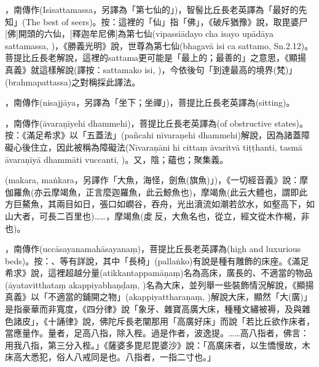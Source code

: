 \startitemgroup[noteitems]
\item{}，南傳作(Isisattamassa，另譯為「第七仙的」)，智髻比丘長老英譯為「最好的先知」(The best of seers)。按：這裡的「仙」指「佛」，《破斥猶豫》說，取毘婆尸[佛]開頭的六仙，[釋迦牟尼佛]為第七仙(vipassiādayo cha isayo upādāya sattamassa, )，《勝義光明》說，世尊為第七仙(bhagavā isi ca sattamo, Sn.2.12)。菩提比丘長老解說，這裡的sattama更可能是「最上的；最善的」之意思，《顯揚真義》就這樣解說(譯按：sattamako isi, )，今依後句「到達最高的境界(梵)」(brahmapattassa)之對稱採此譯法。
\stopitemgroup

\startitemgroup[noteitems]
\item{}，南傳作(nisajjāya，另譯為「坐下；坐禪」)，菩提比丘長老英譯為(sitting)。
\item{}，南傳作(āvaraṇīyehi dhammehi)，菩提比丘長老英譯為(of obstructive states)。按：《滿足希求》以「五蓋法」(pañcahi nīvaraṇehi dhammehi)解說，因為諸蓋障礙心後住立，因此被稱為障礙法(Nīvaraṇāni hi cittaṃ āvaritvā tiṭṭhanti, tasmā āvaraṇīyā dhammāti vuccanti, )。又，陰；蘊也；聚集義。
\stopitemgroup

\startitemgroup[noteitems]
\item{}(makara, maṅkara，另譯作「大魚，海怪，劍魚(旗魚)」)，《一切經音義》說：摩伽羅魚(亦云摩竭魚，正言麼迦羅魚，此云鯨魚也)，摩竭魚(此云大體也，謂即此方巨鰲魚，其兩目如日，張口如𡼏谷，吞舟，光出濆流如潮若欱水，如壑高下，如山大者，可長二百里也)……，摩竭魚(䖍𦾨反，大魚名也，從立，經文從木作楬，非也)。
\stopitemgroup

\startitemgroup[noteitems]
\item{}，南傳作(uccāsayanamahāsayanaṃ)，菩提比丘長老英譯為(high and luxurious beds)。按：、等有詳說，其中「長椅」(pallaṅko)有說是種有雕飾的床座。《滿足希求》說，這裡超越分量(atikkantappamāṇaṃ)名為高床，廣長的、不適當的物品(āyatavitthataṃ akappiyabhaṇḍaṃ, )名為大床，並列舉一些裝飾情況解說，《顯揚真義》以「不適當的鋪開之物」(akappiyattharaṇaṃ,  )解說大床，顯然「大(廣)」是指豪華而非寬度，《四分律》說「象牙、雜寶高廣大床，種種文繡被褥，及與雜色諸皮」，《十誦律》說，佛陀斥長老闡那用「高廣好床」而說「若比丘欲作床者，當應量作。量者，足高八指，除入梐。過是作者，波逸提。……高八指者，佛言：用我八指，第三分入梐。」《薩婆多毘尼毘婆沙》說：「高廣床者，以生憍慢故，木床高大悉犯，俗人八戒同是也。八指者，一指二寸也。」
\stopitemgroup

